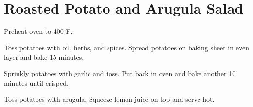 \section{Roasted Potato and Arugula Salad}
\begin{recipe}
	
	
	
	Preheat oven to 400$^{\circ}$F. 
	
	Toss potatoes with oil, herbs, and spices. Spread potatoes on baking sheet in even layer and bake 15 minutes.
	
	Sprinkly potatoes with garlic and toss. Put back in oven and bake another 10 minutes until crisped.
	
	Toss potatoes with arugula. Squeeze lemon juice on top and serve hot.
	
\end{recipe}
